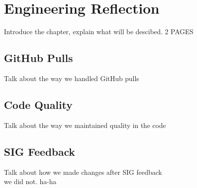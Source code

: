 \chapter{Engineering Reflection} %

Introduce the chapter, explain what will be descibed. 2 PAGES

\section{GitHub Pulls}
Talk about the way we handled GitHub pulls

\section{Code Quality}
Talk about the way we maintained quality in the code

\section{SIG Feedback}
Talk about how we made changes after SIG feedback \\
we did not. ha-ha